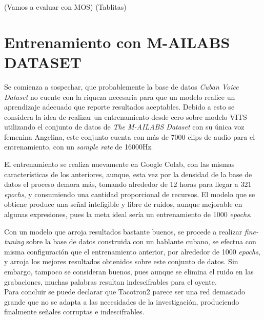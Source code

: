 (Vamos a evaluar con MOS)
(Tablitas)

\section{Entrenamiento con M-AILABS DATASET}
Se comienza a sospechar, que probablemente la base de datos \textit{Cuban Voice Dataset} no cuente con la riqueza necesaria para que un modelo realice un aprendizaje adecuado que reporte resultados aceptables. Debido a esto se considera la idea de realizar un entrenamiento desde cero sobre modelo VITS utilizando el conjunto de datos de \textit{The M-AILABS Dataset} con su única voz femenina Angelina, este conjunto cuenta con más de 7000 clips de audio para el entrenamiento, con un \textit{sample rate} de 16000Hz.

El entrenamiento se realiza nuevamente en Google Colab, con las mismas características de los anteriores, aunque, esta vez por la densidad de la base de datos el proceso demora más, tomando alrededor de 12 horas para llegar a 321 \textit{epochs}, y consumiendo una cantidad proporcional de recursos. El modelo que se obtiene produce una señal inteligible y libre de ruidos, aunque mejorable en algunas expresiones, pues la meta ideal sería un entrenamiento de 1000 \textit{epochs}.

Con un modelo que arroja resultados bastante buenos, se procede a realizar \textit{fine-tuning} sobre la base de datos construida con un hablante cubano, se efectua con misma configuración que el entrenamiento anterior, por alrededor de 1000 \textit{epochs}, y arroja los mejores resultados obtenidos sobre este conjunto de datos. Sin embargo, tampoco se consideran buenos, pues aunque se elimina el ruido en las grabaciones, muchas palabras resultan indescifrables para el oyente.\\

Para concluir se puede declarar que Tacotron2 parece ser una red demasiado grande que no se adapta a las necesidades de la investigación, produciendo finalmente señales corruptas e indescifrables.


